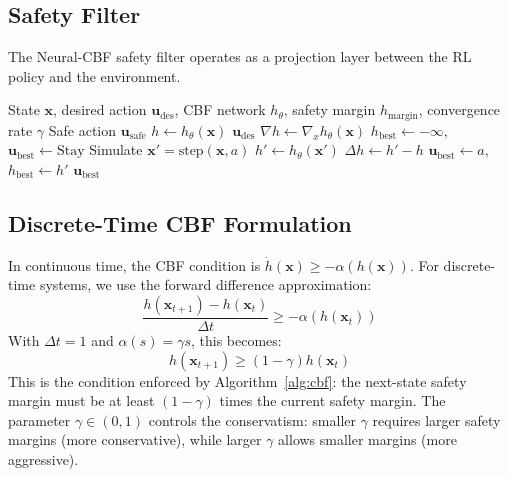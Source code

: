 \documentclass[12pt,a4paper]{article}
\DeclareRobustCommand{\cA}{\mathcal{A}}
\DeclareRobustCommand{\vect}[1]{\bm{#1}}
\begin{document}
\subsection{Safety Filter}
The Neural-CBF safety filter operates as a projection layer between the RL policy and the environment.

\begin{algorithm}[t]
\caption{Neural-CBF Safety Filter for Wildfire Operations}
\label{alg:cbf}
\begin{algorithmic}[1]
\Require State $\vect{x}$, desired action $\vect{u}_{\text{des}}$, CBF network $h_\theta$, safety margin $h_{\text{margin}}$, convergence rate $\gamma$
\Ensure Safe action $\vect{u}_{\text{safe}}$
\State $h \leftarrow h_\theta(\vect{x})$
    \State \Return $\vect{u}_{\text{des}}$ 
\EndIf
\State $\nabla h \leftarrow \nabla_x h_\theta(\vect{x})$
\State $h_{\text{best}} \leftarrow -\infty$, $\vect{u}_{\text{best}} \leftarrow \text{Stay}$
\For{each action $a \in \cA$}
    \State Simulate $\vect{x}' = \text{step}(\vect{x}, a)$
    \State $h' \leftarrow h_\theta(\vect{x}')$
    \State $\Delta h \leftarrow h' - h$
        \State $\vect{u}_{\text{best}} \leftarrow a$, $h_{\text{best}} \leftarrow h'$
    \EndIf
\EndFor
\State \Return $\vect{u}_{\text{best}}$
\end{algorithmic}
\end{algorithm}

\subsection{Discrete-Time CBF Formulation}

In continuous time, the CBF condition is $\dot{h}(\vect{x}) \geq -\alpha(h(\vect{x}))$. For discrete-time systems, we use the forward difference approximation:
\begin{equation}
    \frac{h(\vect{x}_{t+1}) - h(\vect{x}_t)}{\Delta t} \geq -\alpha(h(\vect{x}_t))
\end{equation}
With $\Delta t = 1$ and $\alpha(s) = \gamma s$, this becomes:
\begin{equation}
    h(\vect{x}_{t+1}) \geq (1 - \gamma) h(\vect{x}_t)
    \label{eq:discrete_cbf}
\end{equation}
This is the condition enforced by Algorithm~\ref{alg:cbf}: the next-state safety margin must be at least $(1-\gamma)$ times the current safety margin. The parameter $\gamma \in (0, 1)$ controls the conservatism: smaller $\gamma$ requires larger safety margins (more conservative), while larger $\gamma$ allows smaller margins (more aggressive).
\end{document}
